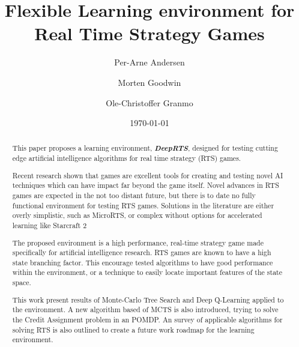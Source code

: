 \documentclass[fleqn,10pt]{article} %
\title{Flexible Learning environment for Real Time Strategy Games}
\date{\today}
\author{Per-Arne Andersen \and Morten Goodwin \and Ole-Christoffer Granmo}
\begin{document}
\flushbottom %
\maketitle %
\begin{abstract}
This paper proposes a learning environment, \textit{\textbf{DeepRTS}}, designed for testing cutting edge artificial intelligence algorithms for real time strategy (RTS) games.

Recent research shown that games are excellent tools for creating and testing novel AI techniques which can have impact far beyond the game itself. Novel advances in RTS games are expected in the not too distant future, but there is to date no fully functional environment for testing RTS games. Solutions in the literature are either overly simplistic, such as MicroRTS, or complex without options for accelerated learning like Starcraft 2

The proposed environment is a high performance, real-time strategy game made specifically for artificial intelligence research. RTS games are known to have a high state branching factor. This encourage tested algorithms to have good performance within the environment, or a technique to easily locate important features of the state space. 


This work present results of Monte-Carlo Tree Search and Deep Q-Learning applied to the environment. A new algorithm based of MCTS is also introduced, trying to solve the Credit Assignment problem in an POMDP.
An survey of applicable algorithms for solving RTS is also outlined to create a future work roadmap for the learning environment.
\end{abstract}

\newpage

\tableofcontents %

\thispagestyle{empty} %
\newpage
\end{document}
